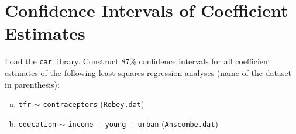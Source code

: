 \documentclass[12pt,letterpaper]{article}
\begin{document}
\section{Confidence Intervals of Coefficient Estimates}

Load the \texttt{car} library.  Construct 87\% confidence intervals for all coefficient estimates of the following least-squares regression analyses (name of the dataset in parenthesis):
\begin{enumerate}[(a)]
	\item \texttt{tfr} $\sim$ \texttt{contraceptors} (\texttt{Robey.dat}) 
	\item \texttt{education} $\sim$ \texttt{income} + \texttt{young} + \texttt{urban}  (\texttt{Anscombe.dat}) 
\end{enumerate}
\end{document}
